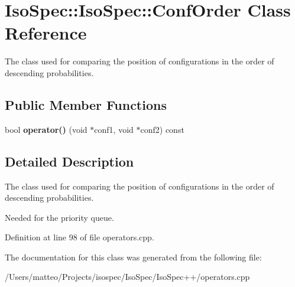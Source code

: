 \hypertarget{class_iso_spec_1_1_iso_spec_1_1_conf_order}{}\section{Iso\+Spec\+:\+:Iso\+Spec\+:\+:Conf\+Order Class Reference}
\label{class_iso_spec_1_1_iso_spec_1_1_conf_order}


The class used for comparing the position of configurations in the order of descending probabilities.  


\subsection*{Public Member Functions}
\begin{DoxyCompactItemize}
\item 
\mbox{\label{class_iso_spec_1_1_iso_spec_1_1_conf_order_adfed4b9c4e5dbd910de88057eb27fdf4}} 
bool {\bfseries operator()} (void $\ast$conf1, void $\ast$conf2) const
\end{DoxyCompactItemize}


\subsection{Detailed Description}
The class used for comparing the position of configurations in the order of descending probabilities. 

Needed for the priority queue. 

Definition at line 98 of file operators.\+cpp.



The documentation for this class was generated from the following file\+:\begin{DoxyCompactItemize}
\item 
/\+Users/matteo/\+Projects/isospec/\+Iso\+Spec/\+Iso\+Spec++/operators.\+cpp\end{DoxyCompactItemize}
